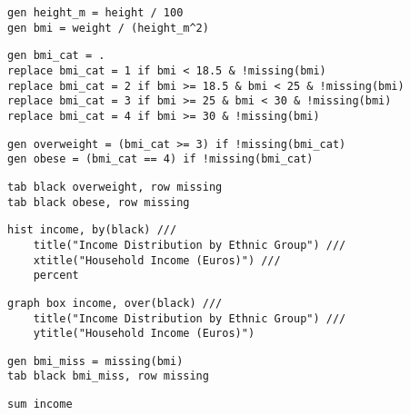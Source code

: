 
\begin{verbatim}
gen height_m = height / 100
gen bmi = weight / (height_m^2)
\end{verbatim}

\begin{verbatim}
gen bmi_cat = .
replace bmi_cat = 1 if bmi < 18.5 & !missing(bmi)
replace bmi_cat = 2 if bmi >= 18.5 & bmi < 25 & !missing(bmi)
replace bmi_cat = 3 if bmi >= 25 & bmi < 30 & !missing(bmi)
replace bmi_cat = 4 if bmi >= 30 & !missing(bmi)    
\end{verbatim}


\begin{verbatim}
gen overweight = (bmi_cat >= 3) if !missing(bmi_cat)
gen obese = (bmi_cat == 4) if !missing(bmi_cat)
\end{verbatim}

\begin{verbatim}
tab black overweight, row missing
tab black obese, row missing
\end{verbatim}

\begin{verbatim}
hist income, by(black) ///
    title("Income Distribution by Ethnic Group") ///
    xtitle("Household Income (Euros)") ///
    percent    
\end{verbatim}

\begin{verbatim}
graph box income, over(black) ///
	title("Income Distribution by Ethnic Group") ///
	ytitle("Household Income (Euros)")
\end{verbatim}

\begin{verbatim}
gen bmi_miss = missing(bmi)
tab black bmi_miss, row missing
\end{verbatim}

\begin{verbatim}
sum income
\end{verbatim}



\newpage